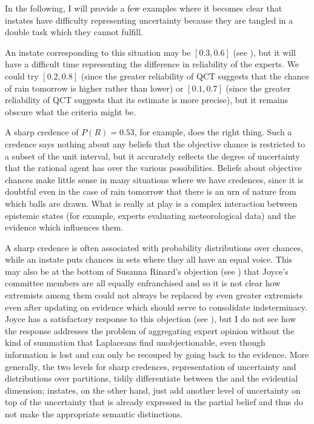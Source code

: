 \documentclass[11pt]{article}
\begin{document}
In the following, I will provide a few examples where it becomes clear
that instates have difficulty representing uncertainty because they
are tangled in a double task which they cannot fulfill.


An instate corresponding to this situation may be $[0.3,0.6]$ (see
), but it will have a difficult time
representing the difference in reliability of the experts. We could
try $[0.2,0.8]$ (since the greater reliability of QCT suggests that
the chance of rain tomorrow is higher rather than lower) or
$[0.1,0.7]$ (since the greater reliability of QCT suggests that its
estimate is more precise), but it remains obscure what the criteria
might be.

A sharp credence of $P(R)=0.53$, for example, does the right thing.
Such a credence says nothing about any beliefs that the objective
chance is restricted to a subset of the unit interval, but it
accurately reflects the degree of uncertainty that the rational agent
has over the various possibilities. Beliefs about objective chances
make little sense in many situations where we have credences, since it
is doubtful even in the case of rain tomorrow that there is an urn of
nature from which balls are drawn. What is really at play is a complex
interaction between epistemic states (for example, experts evaluating
meteorological data) and the evidence which influences them.

A sharp credence is often associated with probability distributions
over chances, while an instate puts chances in sets where they all
have an equal voice. This may also be at the bottom of Susanna
Rinard's objection (see ) that Joyce's
committee members are all equally enfranchised and so it is not clear
how extremists among them could not always be replaced by even greater
extremists even after updating on evidence which should serve to
consolidate indeterminacy. Joyce has a satisfactory response to this
objection (see ), but I do not see how the
response addresses the problem of aggregating expert opinion without
the kind of summation that Laplaceans find unobjectionable, even
though information is lost and can only be recouped by going back to
the evidence. More generally, the two levels for sharp credences,
representation of uncertainty and distributions over partitions,
tidily differentiate between the {\doxnotep} and the evidential
dimension; instates, on the other hand, just add another level of
uncertainty on top of the uncertainty that is already expressed in the
partial belief and thus do not make the appropriate semantic
distinctions.
\end{document}
